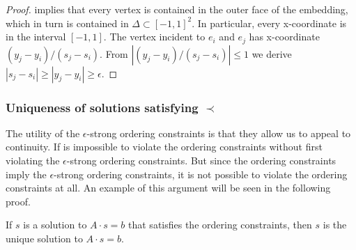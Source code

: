 \documentclass{patmorin}
\begin{document}
\begin{proof}
    implies that every vertex is
contained in the outer face of the
   embedding, which in turn is contained in $\Delta\subset[-1,1]^2$.
In particular, every x-coordinate is
in the interval $[-1,1]$.
The vertex incident to $e_i$ and $e_j$ has x-coordinate
   $(y_j-y_i)/(s_j-s_i)$.
From $|(y_j-y_i)/(s_j-s_i)|\le 1$ we derive
   $|s_j-s_i|\ge|y_j-y_i| \ge \epsilon$.
\end{proof}

\subsubsection{Uniqueness of solutions satisfying $\prec$}

The utility of the $\epsilon$-strong ordering constraints is that they
allow us to appeal to continuity. If is impossible 
to violate
the ordering constraints without first violating the
 $\epsilon$-strong ordering constraints.
But since the ordering constraints imply the
 $\epsilon$-strong ordering constraints,
it is not possible
to violate
the ordering constraints at all.
An example of this argument will be seen in the following proof.

\begin{lem}
   If $s$ is a solution to $A\cdot s=b$ that satisfies the ordering
   constraints, %
then $s$ is 
   the unique solution to $A\cdot s=b$.
\end{lem}
\end{document}
